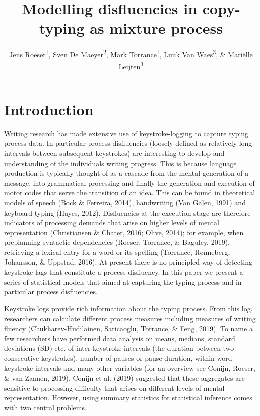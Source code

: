 \documentclass[english,jou,floatsintext]{apa7}
\author{Jens Roeser\textsuperscript{1}, Sven De Maeyer\textsuperscript{2}, Mark Torrance\textsuperscript{1}, Luuk Van Waes\textsuperscript{3}, \& Mariëlle Leijten\textsuperscript{3}}
\affiliation{
\vspace{0.5cm}
\textsuperscript{1} Department of Psychology, Nottingham Trent University, United Kingdom\\\textsuperscript{2} Faculty of Social Sciences, University of Antwerp, Belgium\\\textsuperscript{3} Department of Management, University of Antwerp, Belgium}
\title{Modelling disfluencies in copy-typing as mixture process}
\date{}
\begin{document}
\maketitle

\hypertarget{introduction}{%
\section{Introduction}\label{introduction}}

Writing research has made extensive use of keystroke-logging to capture typing process data. In particular process disfluencies (loosely defined as relatively long intervals between subsequent keystrokes) are interesting to develop and understanding of the individuals writing progress. This is because language production is typically thought of as a cascade from the mental generation of a message, into grammatical processing and finally the generation and execution of motor codes that serve the transition of an idea. This can be found in theoretical models of speech (Bock \& Ferreira, 2014), handwriting (Van Galen, 1991) and keyboard typing (Hayes, 2012). Disfluencies at the execution stage are therefore indicators of processing demands that arise on higher levels of mental representation (Christiansen \& Chater, 2016; Olive, 2014); for example, when preplanning syntactic dependencies (Roeser, Torrance, \& Baguley, 2019), retrieving a lexical entry for a word or its spelling (Torrance, Rønneberg, Johansson, \& Uppstad, 2016). At present there is no principled way of detecting keystroke lags that constitute a process disfluency. In this paper we present a series of statistical models that aimed at capturing the typing process and in particular process disfluencies.

Keystroke logs provide rich information about the typing process. From this log, researchers can calculate different process measures including measures of writing fluency (Chukharev-Hudilainen, Saricaoglu, Torrance, \& Feng, 2019). To name a few researchers have performed data analysis on means, medians, standard deviations (SD) etc. of inter-keystroke intervals (the duration between two consecutive keystrokes), number of pauses or pause duration, within-word keystroke intervals and many other variables (for an overview see Conijn, Roeser, \& van Zaanen, 2019). Conijn et al. (2019) suggested that these aggregates are sensitive to processing difficulty that arises on different levels of mental representation. However, using summary statistics for statistical inference comes with two central problems.
\end{document}
